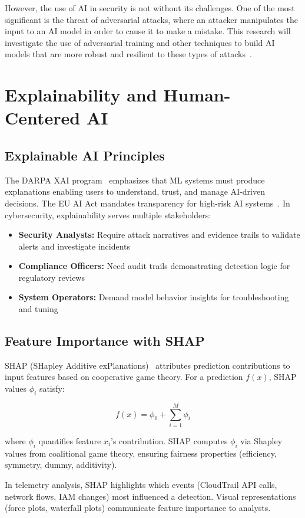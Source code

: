 However, the use of AI in security is not without its challenges. One of the most significant is the threat of adversarial attacks, where an attacker manipulates the input to an AI model in order to cause it to make a mistake. This research will investigate the use of adversarial training and other techniques to build AI models that are more robust and resilient to these types of attacks~\cite{mdpi2024adversarial}.

\section{Explainability and Human-Centered AI}\label{sec:theory-xai}
\subsection{Explainable AI Principles}
The DARPA XAI program~\cite{darpa2020xai} emphasizes that ML systems must produce explanations enabling users to understand, trust, and manage AI-driven decisions. The EU AI Act mandates transparency for high-risk AI systems~\cite{euaiact2023}. In cybersecurity, explainability serves multiple stakeholders:
\begin{itemize}
    \item \textbf{Security Analysts:} Require attack narratives and evidence trails to validate alerts and investigate incidents
    \item \textbf{Compliance Officers:} Need audit trails demonstrating detection logic for regulatory reviews
    \item \textbf{System Operators:} Demand model behavior insights for troubleshooting and tuning
\end{itemize}

\subsection{Feature Importance with SHAP}
SHAP (SHapley Additive exPlanations)~\cite{lundberg2017shap} attributes prediction contributions to input features based on cooperative game theory. For a prediction $f(x)$, SHAP values $\phi_i$ satisfy:

$$f(x) = \phi_0 + \sum_{i=1}^{M} \phi_i$$

where $\phi_i$ quantifies feature $x_i$'s contribution. SHAP computes $\phi_i$ via Shapley values from coalitional game theory, ensuring fairness properties (efficiency, symmetry, dummy, additivity).

In telemetry analysis, SHAP highlights which events (CloudTrail API calls, network flows, IAM changes) most influenced a detection. Visual representations (force plots, waterfall plots) communicate feature importance to analysts.


